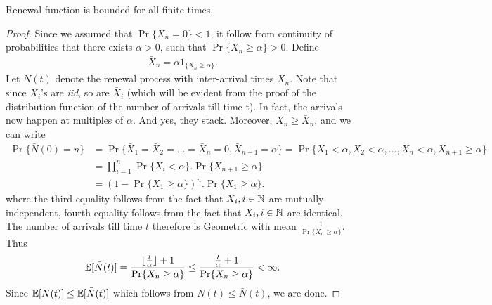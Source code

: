 \documentclass[a4paper,10pt, english]{article}
\begin{document}
\begin{prop} Renewal function is bounded for all finite times.
\end{prop}
\begin{proof}
Since we assumed that $\Pr\{X_n = 0\} < 1$, it follow from continuity of probabilities that there exists $\alpha > 0$, such that $\Pr\{X_n \geq \alpha\} >0$. Define
\begin{align*}
\bar{X}_n = \alpha 1_{\{X_n \geq \alpha\}}.
\end{align*}
Let $\bar{N}(t)$ denote the renewal process with inter-arrival times $\bar{X}_n$. 
Note that since $X_i$'s are \emph{iid}, so are $\bar{X}_i$ (which will be evident from the proof of the distribution function of the number of arrivals till time t). 
In fact, the arrivals now happen at multiples of $\alpha$. And yes, they stack. 
Moreover, $X_n \geq \bar{X}_n$, and we can write 	
\begin{align*}
\Pr\{\bar{N}(0) = n\} &= \Pr\{\bar{X}_1=\bar{X}_2=\dots=\bar{X}_n=0,\bar{X}_{n+1}=\alpha\} = \Pr\{X_1 < \alpha,X_2 < \alpha,\ldots,X_n < \alpha,X_{n+1} \geq \alpha\}\\
&= \prod_{i=1}^{n} \Pr\{X_i < \alpha\} . \Pr\{X_{n+1} \geq \alpha \} \\
&= \left(1- \Pr\{X_1 \geq \alpha \}\right) ^{n} . \Pr\{X_1 \geq \alpha\}.
\end{align*}
where the third equality follows from the fact that $ X_i, i \in \mathbb{N}$ are mutually independent, fourth equality follows from the fact that $ X_i, i \in \mathbb{N}$ are identical.
	\\
	The number of arrivals till time $t$ therefore is Geometric with mean $\frac{1}{\Pr\{X_n \geq \alpha\}}$. Thus 
	\begin{align*}
	\mathbb{E}[\bar{N}(t)] = \frac{\lfloor\frac{t}{\alpha} \rfloor + 1}{\Pr\{X_n \geq \alpha\}} \leq \frac{\frac{t}{\alpha} + 1}{\Pr\{X_n \geq \alpha\}} < \infty.
	\end{align*}
	Since $\mathbb{E}[N(t)] \leq \mathbb{E}[\bar{N}(t)]$ which follows from $N(t) \leq \bar{N}(t)$, we are done.
\end{proof} 
\end{document}
